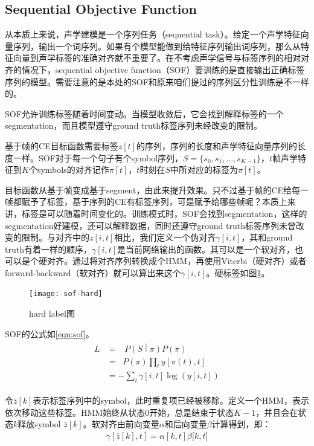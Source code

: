 {\subsection{Sequential Objective Function}
\label{sub:sof}
从本质上来说，声学建模是一个序列任务（sequential task）。给定一个声学特征向量序列，输出一个词序列。如果有个模型能做到给特征序列输出词序列，那么从特征向量到声学标签的准确对齐就不重要了。在不考虑声学信号与标签序列的相对对齐的情况下，sequential objective function（SOF）要训练的是直接输出正确标签序列的模型。需要注意的是本处的SOF和原来咱们提过的序列区分性训练是不一样的。

SOF允许训练标签随着时间变动。当模型收敛后，它会找到解释标签的一个segmentation，而且模型遵守ground truth标签序列未经改变的限制。

基于帧的CE目标函数需要标签$z[t]$的序列，序列的长度和声学特征向量序列的长度一样。SOF对于每一个句子有个symbol序列，$S=\{s_0,s_1,...,s_{K-1}\}$，$t$帧声学特征到$K$个symbols的对齐记作$\pi[t]$，$t$时刻在$S$中所对应的标签为$\pi[t]$。

目标函数从基于帧变成基于segment，由此来提升效果。只不过基于帧的CE给每一帧都赋予了标签，基于序列的CE有标签序列，可是赋予给哪些帧呢？本质上来讲，标签是可以随着时间变化的。训练模式时，SOF会找到segmentation，这样的segmentation好建模，还可以解释数据，同时还遵守ground truth标签序列未曾改变的限制。与对齐中的$z[i,t]$相比，我们定义一个伪对齐$\gamma[i,t]$，其和ground truth有着一样的顺序，$\gamma[i,t]$是当前网络输出的函数。其可以是一个软对齐，也可以是个硬对齐。通过将对齐序列转换成个HMM，再使用Viterbi（硬对齐）或者forward-backward（软对齐）就可以算出来这个$\gamma[i,t]$。硬标签如图\ref{fig:sof-hard}。
\begin{figure}[htbp]
  \centering
  \texttt{[image: sof-hard]}
  \caption{hard label图 \label{fig:sof-hard}}
\end{figure}

SOF的公式如\ref{eqn:sof}。
\begin{align}
\label{eqn:sof}
\begin{split}
	L &= \ \operatorname{}{P\left( S \middle| \pi \right)P\left( \pi \right)} \\
	  &= \operatorname{}{P\left( \pi \right)\prod_{t}^{}{y\left\lbrack \pi\left( t \right),t \right\rbrack}} \\
	  &= - \sum_{i}^{}{\gamma\left\lbrack i,t \right\rbrack\log\left( y\left\lbrack i,t \right\rbrack \right)}
\end{split}
\end{align}

令$\bar{z}[k]$表示标签序列中的symbol，此时重复项已经被移除。定义一个HMM，表示依次移动这些标签。HMM始终从状态$0$开始，总是结束于状态$K-1$，并且会在状态$k$释放symbol $\bar{z}[k]$。软对齐由前向变量$\alpha$和后向变量$\beta$计算得到，即：
\begin{align}
	\gamma\left\lbrack \bar{z}[k],t \right\rbrack = \alpha\left\lbrack k,t \right\rbrack\beta\lbrack k,t\rbrack
\end{align}

}
